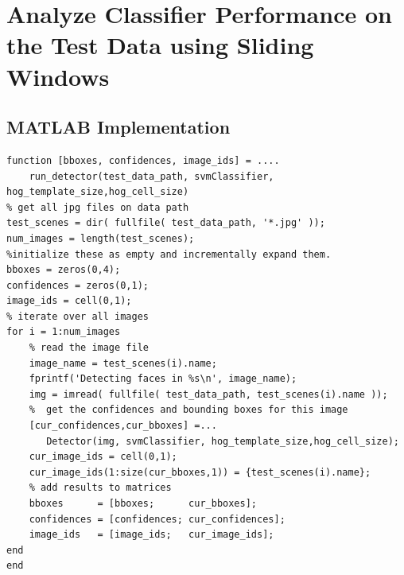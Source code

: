 \documentclass{article}
\begin{document}
\section{Analyze Classifier Performance on the Test Data using Sliding Windows}


\subsection{MATLAB Implementation}

\begin{lstlisting}[caption={My implementation of run\_detector function.},captionpos=b]
function [bboxes, confidences, image_ids] = ....
    run_detector(test_data_path, svmClassifier, hog_template_size,hog_cell_size)
% get all jpg files on data path
test_scenes = dir( fullfile( test_data_path, '*.jpg' ));
num_images = length(test_scenes);
%initialize these as empty and incrementally expand them.
bboxes = zeros(0,4);
confidences = zeros(0,1);
image_ids = cell(0,1);
% iterate over all images
for i = 1:num_images
    % read the image file
    image_name = test_scenes(i).name;
    fprintf('Detecting faces in %s\n', image_name);
    img = imread( fullfile( test_data_path, test_scenes(i).name ));
    %  get the confidences and bounding boxes for this image
    [cur_confidences,cur_bboxes] =...
       Detector(img, svmClassifier, hog_template_size,hog_cell_size);
    cur_image_ids = cell(0,1);
    cur_image_ids(1:size(cur_bboxes,1)) = {test_scenes(i).name}; 
    % add results to matrices
    bboxes      = [bboxes;      cur_bboxes];
    confidences = [confidences; cur_confidences];
    image_ids   = [image_ids;   cur_image_ids];
end
end
\end{lstlisting}
\end{document}
